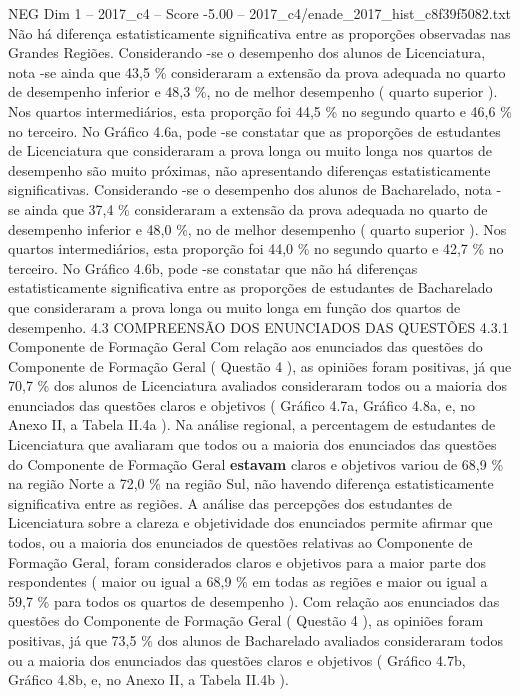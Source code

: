 \begin{textsample}{NEG Dim 1 – 2017\_c4 – Score -5.00 – 2017\_c4/enade\_2017\_hist\_c8f39f5082.txt}
Não há diferença estatisticamente significativa entre as proporções observadas nas Grandes Regiões.
Considerando -se o desempenho dos alunos de Licenciatura, nota -se ainda que 43,5 \% consideraram a extensão da prova adequada no quarto de desempenho inferior e 48,3 \%, no de melhor desempenho ( quarto superior ).
Nos quartos intermediários, esta proporção foi 44,5 \% no segundo quarto e 46,6 \% no terceiro.
No Gráfico 4.6a, pode -se constatar que as proporções de estudantes de Licenciatura que consideraram a prova longa ou muito longa nos quartos de desempenho são muito próximas, não apresentando diferenças estatisticamente significativas.
Considerando -se o desempenho dos alunos de Bacharelado, nota -se ainda que 37,4 \% consideraram a extensão da prova adequada no quarto de desempenho inferior e 48,0 \%, no de melhor desempenho ( quarto superior ).
Nos quartos intermediários, esta proporção foi 44,0 \% no segundo quarto e 42,7 \% no terceiro.
No Gráfico 4.6b, pode -se constatar que não há diferenças estatisticamente significativa entre as proporções de estudantes de Bacharelado que consideraram a prova longa ou muito longa em função dos quartos de desempenho. 4.3 COMPREENSÃO DOS ENUNCIADOS DAS QUESTÕES 4.3.1 Componente de Formação Geral Com relação aos enunciados das questões do Componente de Formação Geral ( Questão 4 ), as opiniões foram positivas, já que 70,7 \% dos alunos de Licenciatura avaliados consideraram todos ou a maioria dos enunciados das questões claros e objetivos ( Gráfico 4.7a, Gráfico 4.8a, e, no Anexo II, a Tabela II.4a ).
Na análise regional, a percentagem de estudantes de Licenciatura que avaliaram que todos ou a maioria dos enunciados das questões do Componente de Formação Geral \textbf{estavam} claros e objetivos variou de 68,9 \% na região Norte a 72,0 \% na região Sul, não havendo diferença estatisticamente significativa entre as regiões.
A análise das percepções dos estudantes de Licenciatura sobre a clareza e objetividade dos enunciados permite afirmar que todos, ou a maioria dos enunciados de questões relativas ao Componente de Formação Geral, foram considerados claros e objetivos para a maior parte dos respondentes ( maior ou igual a 68,9 \% em todas as regiões e maior ou igual a 59,7 \% para todos os quartos de desempenho ).
Com relação aos enunciados das questões do Componente de Formação Geral ( Questão 4 ), as opiniões foram positivas, já que 73,5 \% dos alunos de Bacharelado avaliados consideraram todos ou a maioria dos enunciados das questões claros e objetivos ( Gráfico 4.7b, Gráfico 4.8b, e, no Anexo II, a Tabela II.4b ).

\end{textsample}

